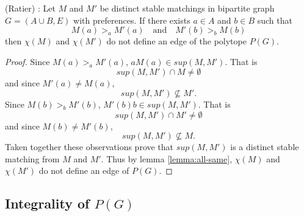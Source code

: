 \begin{corollary}\label{cor:edge} (Ratier) \cite{ratier1996stable}:
Let $M$ and $M'$ be distinct stable matchings in bipartite graph $G=(A\cup B, E)$ with preferences. If there exists $a \in A$ and $b \in B$ such that
\begin{equation}\label{cond:nonedge}
M(a) >_a M'(a)  \quad\text{and}\quad M'(b) >_b M(b)
\end{equation}
then $\chi(M)$ and $\chi(M')$ do not define an edge of the polytope $P(G)$.
\end{corollary}
\begin{proof}
Since $M(a) >_a M'(a)$, $aM(a) \in sup(M,M')$. That is $$sup(M,M') \cap M \neq \emptyset$$ and since $M'(a) \neq M(a)$, 
$$sup(M,M') \not\subseteq M'.$$
Since $M(b) >_b M'(b)$, $M'(b)b \in sup(M,M')$. That is $$sup(M,M') \cap M' \neq \emptyset$$ and since $M(b) \neq M'(b)$,
$$sup(M,M') \not\subseteq M.$$
Taken together these observations prove that $sup(M,M')$ is a distinct stable matching from $M$ and $M'$. Thus by lemma \ref{lemma:all-same}, $\chi(M)$ and $\chi(M')$ do not define an edge of $P(G)$.  
\end{proof}
\subsection{Integrality of $P(G)$}
